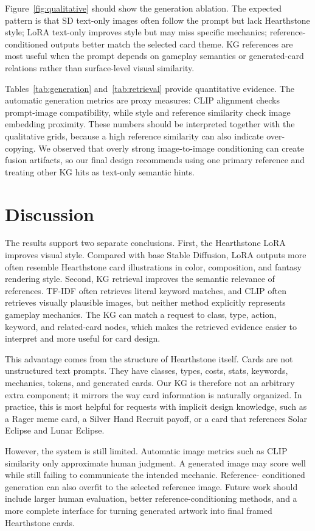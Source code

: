 \documentclass[10pt,twocolumn,letterpaper]{article}
\begin{document}
Figure~\ref{fig:qualitative} should show the generation ablation. The expected pattern is that SD text-only images often follow the prompt but lack Hearthstone style; LoRA text-only improves style but may miss specific mechanics; reference-conditioned outputs better match the selected card theme. KG references are most useful when the prompt depends on gameplay semantics or generated-card relations rather than surface-level visual similarity.

Tables~\ref{tab:generation} and~\ref{tab:retrieval} provide quantitative evidence. The automatic generation metrics are proxy measures: CLIP alignment checks prompt-image compatibility, while style and reference similarity check image embedding proximity. These numbers should be interpreted together with the qualitative grids, because a high reference similarity can also indicate over-copying. We observed that overly strong image-to-image conditioning can create fusion artifacts, so our final design recommends using one primary reference and treating other KG hits as text-only semantic hints.

\section{Discussion}

The results support two separate conclusions. First, the Hearthstone LoRA improves visual style. Compared with base Stable Diffusion, LoRA outputs more often resemble Hearthstone card illustrations in color, composition,
and fantasy rendering style. Second, KG retrieval improves the semantic relevance of references. TF-IDF often retrieves literal keyword matches, and CLIP often retrieves visually plausible images, but neither method
explicitly represents gameplay mechanics. The KG can match a request to class, type, action, keyword, and related-card nodes, which makes the retrieved evidence easier to interpret and more useful for card design.

This advantage comes from the structure of Hearthstone itself. Cards are not unstructured text prompts. They have classes, types, costs, stats, keywords, mechanics, tokens, and generated cards. Our KG is therefore not an
arbitrary extra component; it mirrors the way card information is naturally organized. In practice, this is most helpful for requests with implicit design knowledge, such as a Rager meme card, a Silver Hand Recruit payoff,
or a card that references Solar Eclipse and Lunar Eclipse.

However, the system is still limited. Automatic image metrics such as CLIP similarity only approximate human judgment. A generated image may score well while still failing to communicate the intended mechanic. Reference-
conditioned generation can also overfit to the selected reference image. Future work should include larger human evaluation, better reference-conditioning methods, and a more complete interface for turning generated
artwork into final framed Hearthstone cards.
\end{document}
